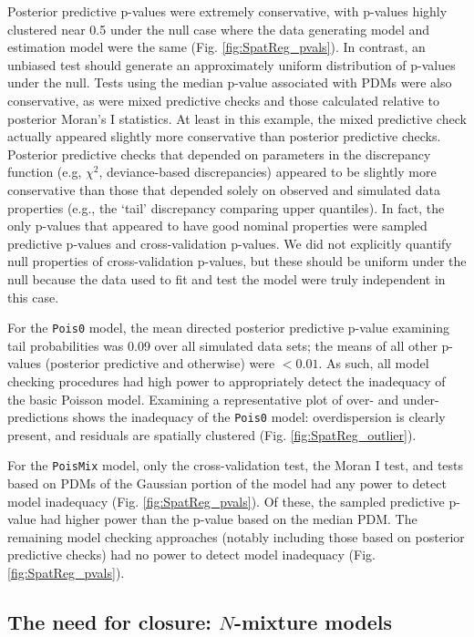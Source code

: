 \documentclass[12pt,english]{article}
\begin{document}
\begin{spacing}{1.9}
Posterior predictive p-values were extremely conservative, with
p-values highly clustered near 0.5 under the null case where the data
generating model and estimation model were the same
(Fig. \ref{fig:SpatReg_pvals}).  In contrast, an unbiased test should
generate an approximately uniform distribution of p-values under the
null.  Tests using the median p-value associated with PDMs were also
conservative, as were mixed predictive checks and those calculated
relative to posterior Moran's I statistics.  At least in this example,
the mixed predictive check actually appeared slightly more
conservative than posterior predictive checks.  Posterior predictive
checks that depended on parameters in the discrepancy function (e.g,
$\chi^2$, deviance-based discrepancies) appeared to be slightly more
conservative than those that depended solely on observed and simulated
data properties (e.g., the `tail' discrepancy comparing upper
quantiles).  In fact, the only p-values that appeared to have good
nominal properties were sampled predictive p-values and
cross-validation p-values.  We did not explicitly quantify null
properties of cross-validation p-values, but these should be uniform
under the null because the data used to fit and test the model were
truly independent in this case.

For the \texttt{Pois0} model, the mean directed posterior predictive
p-value examining tail probabilities was 0.09 over all simulated data
sets; the means of all other p-values (posterior predictive and
otherwise) were $<0.01$.  As such, all
model checking procedures had high power to appropriately detect the
inadequacy of the basic Poisson model.  Examining a representative plot of
over- and under-predictions shows the inadequacy of the  
\texttt{Pois0} model: overdispersion is clearly present, and residuals are spatially
clustered (Fig. \ref{fig:SpatReg_outlier}). 

For the \texttt{PoisMix} model, only the cross-validation test, the
Moran I test, and tests based on PDMs of the Gaussian portion of the
model had any power to detect model inadequacy
(Fig. \ref{fig:SpatReg_pvals}).  Of these, the sampled predictive
p-value had higher power than the p-value based on the median PDM.
The remaining model checking approaches (notably including those based
on posterior predictive checks) had no power to detect model
inadequacy (Fig. \ref{fig:SpatReg_pvals}).



\subsection{The need for closure: $N$-mixture models}


\end{spacing}
\end{document}
